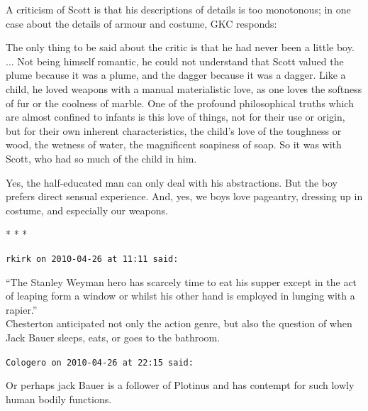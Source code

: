 A criticism of Scott is that his descriptions of details is too monotonous; in one case about the details of armour and costume, GKC responds:

\begin{quotex}
The only thing to be said about the critic is that he had never been a little boy. ... Not being himself romantic, he could not understand that Scott valued the plume because it was a plume, and the dagger because it was a dagger. Like a child, he loved weapons with a manual materialistic love, as one loves the softness of fur or the coolness of marble. One of the profound philosophical truths which are almost confined to infants is this love of things, not for their use or origin, but for their own inherent characteristics, the child's love of the toughness or wood, the wetness of water, the magnificent soapiness of soap. So it was with Scott, who had so much of the child in him.
\end{quotex}


Yes, the half-educated man can only deal with his abstractions. But the boy prefers direct sensual experience. And, yes, we boys love pageantry, dressing up in costume, and especially our weapons.



\begin{center}* * *\end{center}

\begin{footnotesize}
\begin{sffamily}
\texttt{rkirk on 2010-04-26 at 11:11 said:}

``The Stanley Weyman hero has scarcely time to eat his supper except in the act of leaping form a window or whilst his other hand is employed in lunging with a rapier.''\\ Chesterton anticipated not only the action genre, but also the question of when Jack Bauer sleeps, eats, or goes to the bathroom.

\hfill

\texttt{Cologero on 2010-04-26 at 22:15 said:}

Or perhaps jack Bauer is a follower of Plotinus and has contempt for such lowly human bodily functions.

\end{sffamily}
\end{footnotesize}

